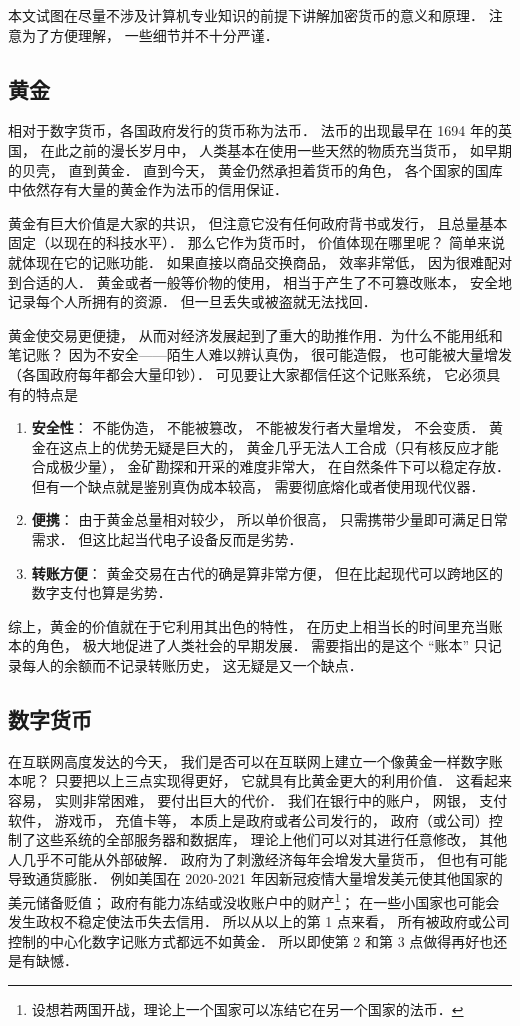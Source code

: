 
本文试图在尽量不涉及计算机专业知识的前提下讲解加密货币的意义和原理． 注意为了方便理解， 一些细节并不十分严谨．

\subsection{黄金}
相对于数字货币，各国政府发行的货币称为法币． 法币的出现最早在 1694 年的英国， 在此之前的漫长岁月中， 人类基本在使用一些天然的物质充当货币， 如早期的贝壳， 直到黄金． 直到今天， 黄金仍然承担着货币的角色， 各个国家的国库中依然存有大量的黄金作为法币的信用保证．

黄金有巨大价值是大家的共识， 但注意它没有任何政府背书或发行， 且总量基本固定（以现在的科技水平）． 那么它作为货币时， 价值体现在哪里呢？ 简单来说就体现在它的记账功能． 如果直接以商品交换商品， 效率非常低， 因为很难配对到合适的人． 黄金或者一般等价物的使用， 相当于产生了不可篡改账本， 安全地记录每个人所拥有的资源． 但一旦丢失或被盗就无法找回．

黄金使交易更便捷， 从而对经济发展起到了重大的助推作用．为什么不能用纸和笔记账？ 因为不安全——陌生人难以辨认真伪， 很可能造假， 也可能被大量增发（各国政府每年都会大量印钞）． 可见要让大家都信任这个记账系统， 它必须具有的特点是
\begin{enumerate}
\item \textbf{安全性}： 不能伪造， 不能被篡改， 不能被发行者大量增发， 不会变质． 黄金在这点上的优势无疑是巨大的， 黄金几乎无法人工合成（只有核反应才能合成极少量）， 金矿勘探和开采的难度非常大， 在自然条件下可以稳定存放． 但有一个缺点就是鉴别真伪成本较高， 需要彻底熔化或者使用现代仪器．
\item \textbf{便携}： 由于黄金总量相对较少， 所以单价很高， 只需携带少量即可满足日常需求． 但这比起当代电子设备反而是劣势．
\item \textbf{转账方便}： 黄金交易在古代的确是算非常方便， 但在比起现代可以跨地区的数字支付也算是劣势．
\end{enumerate}

综上，黄金的价值就在于它利用其出色的特性， 在历史上相当长的时间里充当账本的角色， 极大地促进了人类社会的早期发展． 需要指出的是这个 “账本” 只记录每人的余额而不记录转账历史， 这无疑是又一个缺点．

\subsection{数字货币}
在互联网高度发达的今天， 我们是否可以在互联网上建立一个像黄金一样数字账本呢？ 只要把以上三点实现得更好， 它就具有比黄金更大的利用价值． 这看起来容易， 实则非常困难， 要付出巨大的代价． 我们在银行中的账户， 网银， 支付软件， 游戏币， 充值卡等， 本质上是政府或者公司发行的， 政府（或公司）控制了这些系统的全部服务器和数据库， 理论上他们可以对其进行任意修改， 其他人几乎不可能从外部破解． 政府为了刺激经济每年会增发大量货币， 但也有可能导致通货膨胀． 例如美国在 2020-2021 年因新冠疫情大量增发美元使其他国家的美元储备贬值； 政府有能力冻结或没收账户中的财产\footnote{设想若两国开战，理论上一个国家可以冻结它在另一个国家的法币．}； 在一些小国家也可能会发生政权不稳定使法币失去信用． 所以从以上的第 1 点来看， 所有被政府或公司控制的中心化数字记账方式都远不如黄金． 所以即使第 2 和第 3 点做得再好也还是有缺憾．

